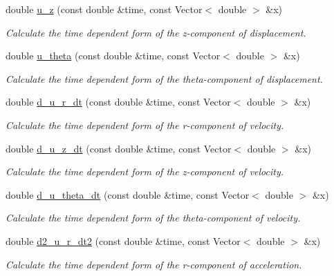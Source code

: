 \begin{DoxyCompactItemize}
double \hyperlink{namespaceGlobal__Parameters_adc24d54054d6868dfb4bf3eedb2b062d}{u\+\_\+z} (const double \&time, const Vector$<$ double $>$ \&x)
\begin{DoxyCompactList}\small\item\em Calculate the time dependent form of the z-\/component of displacement. \end{DoxyCompactList}\item 
double \hyperlink{namespaceGlobal__Parameters_aed85254e9565e5e25dbe336a799bf6b5}{u\+\_\+theta} (const double \&time, const Vector$<$ double $>$ \&x)
\begin{DoxyCompactList}\small\item\em Calculate the time dependent form of the theta-\/component of displacement. \end{DoxyCompactList}\item 
double \hyperlink{namespaceGlobal__Parameters_aa587494218fe51b7d23a58009bf370f6}{d\+\_\+u\+\_\+r\+\_\+dt} (const double \&time, const Vector$<$ double $>$ \&x)
\begin{DoxyCompactList}\small\item\em Calculate the time dependent form of the r-\/component of velocity. \end{DoxyCompactList}\item 
double \hyperlink{namespaceGlobal__Parameters_adc07c67f4203664ac0c23c4ff9d4dac1}{d\+\_\+u\+\_\+z\+\_\+dt} (const double \&time, const Vector$<$ double $>$ \&x)
\begin{DoxyCompactList}\small\item\em Calculate the time dependent form of the z-\/component of velocity. \end{DoxyCompactList}\item 
double \hyperlink{namespaceGlobal__Parameters_a87fd49f1b07cd74a364cf1373890864e}{d\+\_\+u\+\_\+theta\+\_\+dt} (const double \&time, const Vector$<$ double $>$ \&x)
\begin{DoxyCompactList}\small\item\em Calculate the time dependent form of the theta-\/component of velocity. \end{DoxyCompactList}\item 
double \hyperlink{namespaceGlobal__Parameters_a37715fdf266bd7d91b44ad779e20a11a}{d2\+\_\+u\+\_\+r\+\_\+dt2} (const double \&time, const Vector$<$ double $>$ \&x)
\begin{DoxyCompactList}\small\item\em Calculate the time dependent form of the r-\/component of acceleration. \end{DoxyCompactList}\item 

\end{DoxyCompactItemize}

